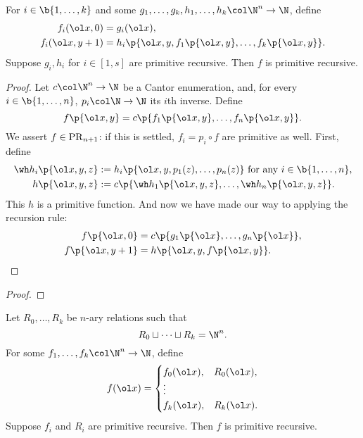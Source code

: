 \begin{theorem}
  For $i \in \b{1, \dots, k}$ and some $g_1, \dots, g_k, h_1, \dots, h_k \col \N^n \to \N$, define
  \begin{align*}
    f_i(\ol x , 0) &= g_i(\ol x), \\
    f_i(\ol x, y+1) &= h_i\p{\ol x, y, f_1\p{\ol x, y}, \dots, f_k\p{\ol x, y}}.
  \end{align*}
  Suppose $g_i, h_i$ for $i \in [1, s]$ are primitive recursive. Then $f$ is primitive recursive.
\end{theorem}

\begin{proof}
  Let $c \col \N^n \to \N$ be a Cantor enumeration, and, for every $i \in \b{1, \dots, n}$, $p_i \col \N \to \N$ its $i$th inverse. Define
  $$ f\p{\ol x, y} = c\p{f_1\p{\ol x, y}, \dots, f_n\p{\ol x, y}}. $$
  We assert $f \in \operatorname{PR}_{n+1}$: if this is settled, $f_i = p_i \circ f$ are primitive as well.
  First, define 
  \begin{align*}
    \wh h_i\p{\ol x, y, z} &:= h_i\p{\ol x, y, p_1(z), \dots, p_n(z)} \text{ for any $i \in \b{1, \dots, n}$}, \\
    h\p{\ol x, y, z} &:= c\p{\wh h_1\p{\ol x, y, z}, \dots, \wh h_n\p{\ol x, y, z}}.
  \end{align*}
  This $h$ is a primitive function.
  And now we have made our way to applying the recursion rule:
  \begin{align*}
    f\p{\ol x, 0} &= c\p{g_1\p{\ol x}, \dots, g_n\p{\ol x}}, \\
    f\p{\ol x, y+1} &= h\p{\ol x, y, f\p{\ol x, y}}.
  \end{align*}
\end{proof}

\begin{proof}

\end{proof}

\begin{theorem}
  Let $R_0, \dots, R_k$ be $n$-ary relations such that
  $$ R_0 \sqcup \dots \sqcup R_k = \N^n. $$
  For some $f_1, \dots, f_k \col \N^n \to \N$, define
  $$
  f(\ol x) =
  \begin{cases}
    f_0(\ol x), & R_0(\ol x), \\
    \vdots \\
    f_k(\ol x ), & R_k(\ol x).
  \end{cases}
  $$
  Suppose $f_i$ and $R_i$ are primitive recursive. Then $f$ is primitive recursive.
\end{theorem}

